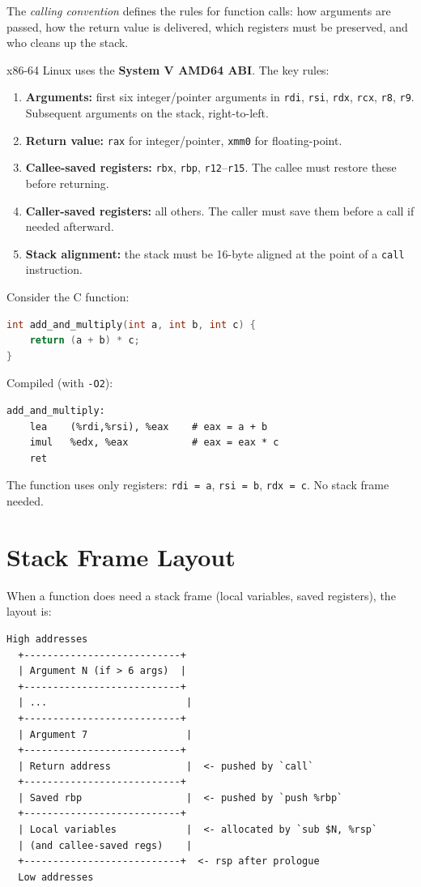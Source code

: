 The \emph{calling convention} defines the rules for function calls: how arguments are passed, how the return value is delivered, which registers must be preserved, and who cleans up the stack.

x86-64 Linux uses the \textbf{System V AMD64 ABI}. The key rules:

\begin{enumerate}
	\item \textbf{Arguments:} first six integer/pointer arguments in \texttt{rdi}, \texttt{rsi}, \texttt{rdx}, \texttt{rcx}, \texttt{r8}, \texttt{r9}. Subsequent arguments on the stack, right-to-left.
	\item \textbf{Return value:} \texttt{rax} for integer/pointer, \texttt{xmm0} for floating-point.
	\item \textbf{Callee-saved registers:} \texttt{rbx}, \texttt{rbp}, \texttt{r12}--\texttt{r15}. The callee must restore these before returning.
	\item \textbf{Caller-saved registers:} all others. The caller must save them before a call if needed afterward.
	\item \textbf{Stack alignment:} the stack must be 16-byte aligned at the point of a \texttt{call} instruction.
\end{enumerate}

\begin{example}
	Consider the C function:
	\begin{lstlisting}[language=C]
int add_and_multiply(int a, int b, int c) {
    return (a + b) * c;
}
	\end{lstlisting}
	Compiled (with \texttt{-O2}):
	\begin{lstlisting}[language=ASM]
add_and_multiply:
    lea    (%rdi,%rsi), %eax    # eax = a + b
    imul   %edx, %eax           # eax = eax * c
    ret
	\end{lstlisting}
	The function uses only registers: \texttt{rdi = a}, \texttt{rsi = b}, \texttt{rdx = c}. No stack frame needed.
\end{example}

\section{Stack Frame Layout}

When a function does need a stack frame (local variables, saved registers), the layout is:

\begin{lstlisting}[caption=Typical stack frame layout]
  High addresses
  +---------------------------+
  | Argument N (if > 6 args)  |
  +---------------------------+
  | ...                        |
  +---------------------------+
  | Argument 7                 |
  +---------------------------+
  | Return address             |  <- pushed by `call`
  +---------------------------+
  | Saved rbp                  |  <- pushed by `push %rbp`
  +---------------------------+
  | Local variables            |  <- allocated by `sub $N, %rsp`
  | (and callee-saved regs)    |
  +---------------------------+  <- rsp after prologue
  Low addresses
\end{lstlisting}

